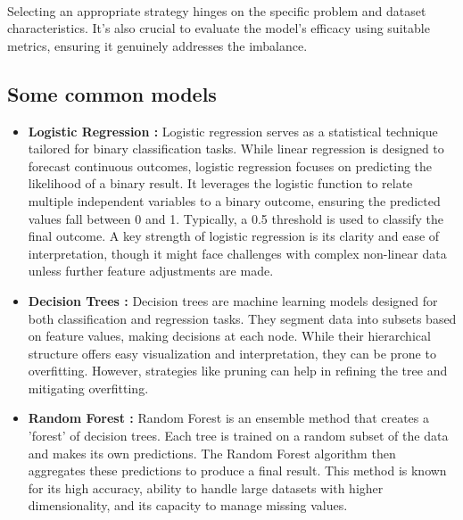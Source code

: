         \paragraph{}Selecting an appropriate strategy hinges on the specific problem and dataset characteristics. It's also crucial to evaluate the model's efficacy using suitable metrics, ensuring it genuinely addresses the imbalance.

    \subsection{Some common models}\label{seq:background:some_ml_common_models}
    \begin{itemize}
        \item \textbf{Logistic Regression\cite{nick_logistic_2007} : }Logistic regression serves as a statistical technique tailored for binary classification tasks. While linear regression is designed to forecast continuous outcomes, logistic regression focuses on predicting the likelihood of a binary result. It leverages the logistic function to relate multiple independent variables to a binary outcome, ensuring the predicted values fall between 0 and 1. Typically, a 0.5 threshold is used to classify the final outcome. A key strength of logistic regression is its clarity and ease of interpretation, though it might face challenges with complex non-linear data unless further feature adjustments are made.
        
        \item \textbf{Decision Trees\cite{kotsiantis_decision_2013} : }Decision trees are machine learning models designed for both classification and regression tasks. They segment data into subsets based on feature values, making decisions at each node. While their hierarchical structure offers easy visualization and interpretation, they can be prone to overfitting. However, strategies like pruning can help in refining the tree and mitigating overfitting.
        
        \item \textbf{Random Forest\cite{probst_hyperparameters_2019} : }Random Forest is an ensemble method that creates a 'forest' of decision trees. Each tree is trained on a random subset of the data and makes its own predictions. The Random Forest algorithm then aggregates these predictions to produce a final result. This method is known for its high accuracy, ability to handle large datasets with higher dimensionality, and its capacity to manage missing values.
        

\end{itemize}
